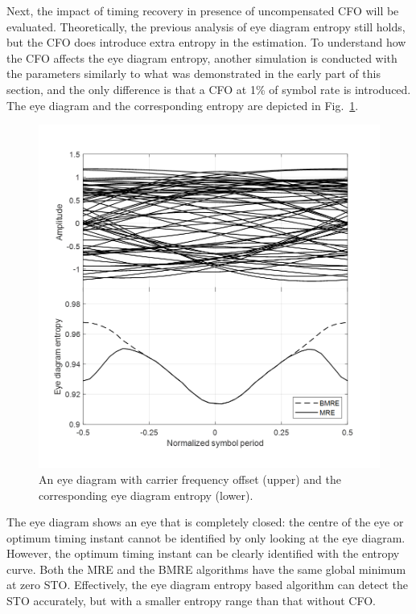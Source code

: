 \documentclass[12pt, draftclsnofoot, onecolumn]{IEEEtran}
\begin{document}
Next, the impact of timing recovery in presence of uncompensated CFO will be evaluated.  
Theoretically, the previous analysis of eye diagram entropy still holds, but the CFO does introduce extra entropy in the estimation.
To understand how the CFO affects the eye diagram entropy, another simulation is conducted with the parameters similarly to what was demonstrated in the early part of this section,
and the only difference is that a CFO at 1\% of symbol rate is introduced.
The eye diagram and the corresponding entropy are depicted in Fig.~\ref{fig:timing_freq}.
      
\begin{figure}[ht]
\centering
\includegraphics[width=3.1 in]{pic/timing_freq.png}
\caption{An eye diagram with carrier frequency offset (upper) and the corresponding eye diagram entropy (lower).}
\label{fig:timing_freq} 
\end{figure}

The eye diagram shows an eye that is completely closed: the centre of the eye or optimum timing instant cannot be identified by only looking at the eye diagram.
However, the optimum timing instant can be clearly identified with the entropy curve.
Both the MRE and the BMRE algorithms have the same global minimum at zero STO. 
Effectively, the eye diagram entropy based algorithm can detect the STO accurately,
but with a smaller entropy range than that without CFO.
\end{document}
